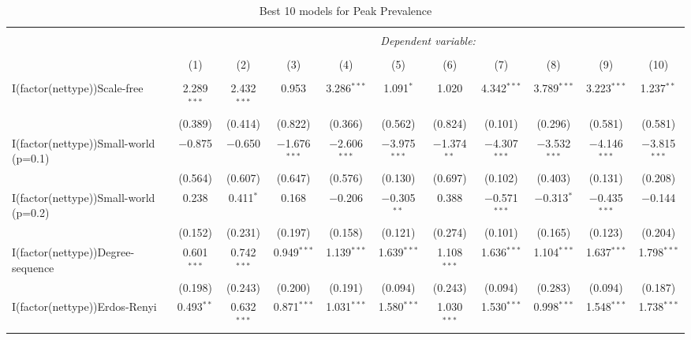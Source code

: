 
\begin{table}[!htbp] \centering 
  \caption{Best 10 models for Peak Prevalence} 
  \label{tab:best_models_peak_preval} 
\begin{tabular}{@{\extracolsep{5pt}}lcccccccccc} 
\\[-1.8ex]\hline 
\hline \\[-1.8ex] 
 & \multicolumn{10}{c}{\textit{Dependent variable:}} \\ 
\cline{2-11} 
\\[-1.8ex] & (1) & (2) & (3) & (4) & (5) & (6) & (7) & (8) & (9) & (10)\\ 
\hline \\[-1.8ex] 
 I(factor(nettype))Scale-free & 2.289$^{***}$ & 2.432$^{***}$ & 0.953 & 3.286$^{***}$ & 1.091$^{*}$ & 1.020 & 4.342$^{***}$ & 3.789$^{***}$ & 3.223$^{***}$ & 1.237$^{**}$ \\ 
  & (0.389) & (0.414) & (0.822) & (0.366) & (0.562) & (0.824) & (0.101) & (0.296) & (0.581) & (0.581) \\ 
  I(factor(nettype))Small-world (p=0.1) & $-$0.875 & $-$0.650 & $-$1.676$^{***}$ & $-$2.606$^{***}$ & $-$3.975$^{***}$ & $-$1.374$^{**}$ & $-$4.307$^{***}$ & $-$3.532$^{***}$ & $-$4.146$^{***}$ & $-$3.815$^{***}$ \\ 
  & (0.564) & (0.607) & (0.647) & (0.576) & (0.130) & (0.697) & (0.102) & (0.403) & (0.131) & (0.208) \\ 
  I(factor(nettype))Small-world (p=0.2) & 0.238 & 0.411$^{*}$ & 0.168 & $-$0.206 & $-$0.305$^{**}$ & 0.388 & $-$0.571$^{***}$ & $-$0.313$^{*}$ & $-$0.435$^{***}$ & $-$0.144 \\ 
  & (0.152) & (0.231) & (0.197) & (0.158) & (0.121) & (0.274) & (0.101) & (0.165) & (0.123) & (0.204) \\ 
  I(factor(nettype))Degree-sequence & 0.601$^{***}$ & 0.742$^{***}$ & 0.949$^{***}$ & 1.139$^{***}$ & 1.639$^{***}$ & 1.108$^{***}$ & 1.636$^{***}$ & 1.104$^{***}$ & 1.637$^{***}$ & 1.798$^{***}$ \\ 
  & (0.198) & (0.243) & (0.200) & (0.191) & (0.094) & (0.243) & (0.094) & (0.283) & (0.094) & (0.187) \\ 
  I(factor(nettype))Erdos-Renyi & 0.493$^{**}$ & 0.632$^{***}$ & 0.871$^{***}$ & 1.031$^{***}$ & 1.580$^{***}$ & 1.030$^{***}$ & 1.530$^{***}$ & 0.998$^{***}$ & 1.548$^{***}$ & 1.738$^{***}$ \\ 

\end{tabular}
\end{table}
